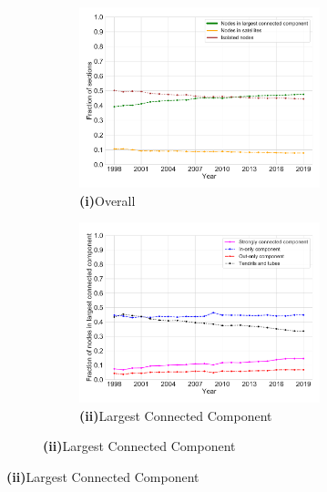 \documentclass[varwidth, border=0pt]{standalone}
\begin{document}
	
	\begin{figure}
	\centering
\begin{subfigure}{\linewidth}
	\begin{multicols}{2}
		\centering
		\begin{subfigure}{\linewidth}
			\includegraphics[width=\linewidth]{../../graphics/connectivity-development-us.pdf}
			\caption*{\textbf{\textsf{(i)}}\quad Overall}
		\end{subfigure}
		\newpage
		\begin{subfigure}{\linewidth}
			\includegraphics[width=\linewidth]{../../graphics/connectivity-lcc-us.pdf}
			\caption*{\textbf{\textsf{(ii)}}\quad Largest Connected Component}
		\end{subfigure}	
	\end{multicols}
	\vspace*{-6pt}
\end{subfigure}


\end{figure}
\end{document}
